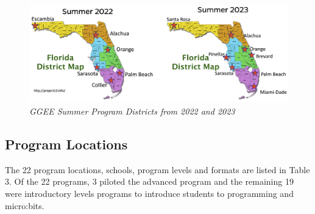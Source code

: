 \documentclass[
]{article}
\begin{document}
\begin{figure}
\centering
\includegraphics{Images/GGEE_23_FL District Map.jpg}
\caption{\emph{GGEE Summer Program Districts from 2022 and 2023}}
\end{figure}

\hypertarget{program-locations}{%
\subsection{Program Locations}\label{program-locations}}

The 22 program locations, schools, program levels and formats are listed
in Table 3. Of the 22 programs, 3 piloted the advanced program and the
remaining 19 were introductory levels programs to introduce students to
programming and micro:bits.
\end{document}
